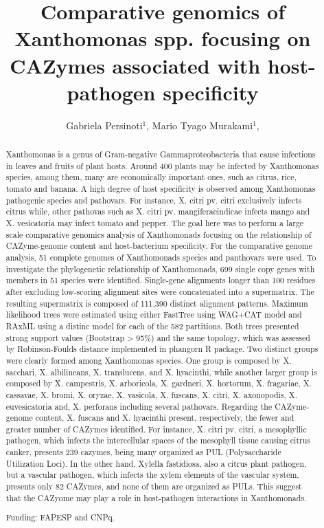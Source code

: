 \documentclass[twoside]{article}
\title{\vspace{-15mm}\fontsize{24pt}{10pt}\selectfont\textbf{ Comparative genomics of Xanthomonas spp. focusing on CAZymes associated with host-pathogen specificity }} %
\author{ Gabriela Persinoti$^{1}$, Mario Tyago Murakami$^{1}$, }
\affil{ 1 CTBE/CNPEM

 }
\date{}
\begin{document}
  
  
  \maketitle %
  
  
  \thispagestyle{fancy} %
  
  
  \begin{abstract}
  Xanthomonas is a genus of Gram-negative Gammaproteobacteria that cause infections in leaves and fruits of plant hosts. Around 400 plants may be infected by Xanthomonas species, among them, many are economically important ones, such as citrus, rice, tomato and banana. A high degree of host specificity is observed among Xanthomonas pathogenic species and pathovars. For instance, X. citri pv. citri exclusively infects citrus while, other pathovas such as X. citri pv. mangiferaeindicae infects mango and X. vesicatoria may infect tomato and pepper. The goal here was to perform a large scale comparative genomics analysis of Xanthomonads focusing on the relationship of CAZyme-genome content and host-bacterium specificity. For the comparative genome analysis, 51 complete genomes of Xanthomonads species and panthovars were used. To investigate the phylogenetic relationship of Xanthomonads, 699 single copy genes with members in 51 species were identified. Single-gene alignments longer than 100 residues after excluding low-scoring alignment sites were concatenated into a supermatrix. The resulting supermatrix is composed of 111,390 distinct alignment patterns. Maximum likelihood trees were estimated using either FastTree using WAG+CAT model and RAxML using a distinc model for each of the 582 partitions. Both trees presented strong support values (Bootstrap > 95\%) and the same topology, which was assessed by Robinson-Foulds distance implemented in phangorn R package. Two distinct groups were clearly formed among Xanthomonas species. One group is composed by X. sacchari, X. albilineans, X. translucens, and X. hyacinthi, while another larger group is composed by X.  campestris, X.  arboricola, X.  gardneri, X.  hortorum, X.  fragariae, X.  cassavae, X. bromi, X.  oryzae, X.  vasicola, X.  fuscans, X.  citri, X.  axonopodis, X.  euvesicatoria and, X.  perforans including several pathovars. Regarding the CAZyme-genome content, X. fuscans and X. hyacinthi present, respectively, the fewer and greater number of CAZymes identified. For instance, X. citri pv. citri, a mesophyllic pathogen, which infects the intercellular spaces of the mesophyll tissue causing citrus canker, presents 239 cazymes, being many organized as PUL (Polysaccharide Utilization Loci). In the other hand, Xylella fastidiosa, also a citrus plant pathogen, but a vascular pathogen, which infects the xylem elements of the vascular system, presents only 82 CAZymes, and none of them are organized as PULs. This suggest that the CAZyome may play a role in host-pathogen interactions in Xanthomonads.
  
  Funding: FAPESP and CNPq. \\ 
  \end{abstract}
  
\end{document}
